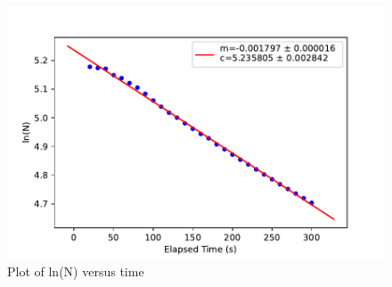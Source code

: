 \documentclass[a4paper, amsfonts, amssymb, amsmath, reprint, showkeys, nofootinbib, twoside]{revtex4-1}
\begin{document}
\begin{figure}[H]
	\centering
	\includegraphics[scale=0.6]{lnt} 
	\caption{Plot of ln(N) versus time}
\end{figure}
\end{document}
